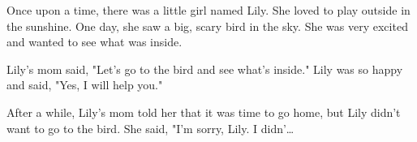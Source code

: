 Once upon a time, there was a little girl named Lily. She loved to play outside in the sunshine. One day, she saw a big, scary bird in the sky. She was very excited and wanted to see what was inside.\par
Lily's mom said, "Let's go to the bird and see what's inside." Lily was so happy and said, "Yes, I will help you."\par
After a while, Lily's mom told her that it was time to go home, but Lily didn't want to go to the bird. She said, "I'm sorry, Lily. I didn'\ldots\par
